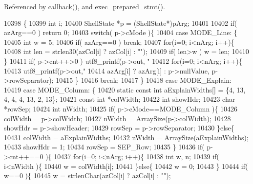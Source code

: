 Referenced by callback(), and exec\+\_\+prepared\+\_\+stmt().


\begin{DoxyCode}
10398  \{
10399   \textcolor{keywordtype}{int} i;
10400   ShellState *p = (ShellState*)pArg;
10401 
10402   \textcolor{keywordflow}{if}( azArg==0 ) \textcolor{keywordflow}{return} 0;
10403   \textcolor{keywordflow}{switch}( p->cMode )\{
10404     \textcolor{keywordflow}{case} MODE_Line: \{
10405       \textcolor{keywordtype}{int} w = 5;
10406       \textcolor{keywordflow}{if}( azArg==0 ) \textcolor{keywordflow}{break};
10407       \textcolor{keywordflow}{for}(i=0; i<nArg; i++)\{
10408         \textcolor{keywordtype}{int} len = strlen30(azCol[i] ? azCol[i] : \textcolor{stringliteral}{""});
10409         \textcolor{keywordflow}{if}( len>w ) w = len;
10410       \}
10411       \textcolor{keywordflow}{if}( p->cnt++>0 ) utf8_printf(p->out, \textcolor{stringliteral}{"%
10412       \textcolor{keywordflow}{for}(i=0; i<nArg; i++)\{
10413         utf8_printf(p->out,\textcolor{stringliteral}{"%
10414                 azArg[i] ? azArg[i] : p->nullValue, p->rowSeparator);
10415       \}
10416       \textcolor{keywordflow}{break};
10417     \}
10418     \textcolor{keywordflow}{case} MODE_Explain:
10419     \textcolor{keywordflow}{case} MODE_Column: \{
10420       \textcolor{keyword}{static} \textcolor{keyword}{const} \textcolor{keywordtype}{int} aExplainWidths[] = \{4, 13, 4, 4, 4, 13, 2, 13\};
10421       \textcolor{keyword}{const} \textcolor{keywordtype}{int} *colWidth;
10422       \textcolor{keywordtype}{int} showHdr;
10423       \textcolor{keywordtype}{char} *rowSep;
10424       \textcolor{keywordtype}{int} nWidth;
10425       \textcolor{keywordflow}{if}( p->cMode==MODE_Column )\{
10426         colWidth = p->colWidth;
10427         nWidth = ArraySize(p->colWidth);
10428         showHdr = p->showHeader;
10429         rowSep = p->rowSeparator;
10430       \}\textcolor{keywordflow}{else}\{
10431         colWidth = aExplainWidths;
10432         nWidth = ArraySize(aExplainWidths);
10433         showHdr = 1;
10434         rowSep = SEP_Row;
10435       \}
10436       \textcolor{keywordflow}{if}( p->cnt++==0 )\{
10437         \textcolor{keywordflow}{for}(i=0; i<nArg; i++)\{
10438           \textcolor{keywordtype}{int} w, n;
10439           \textcolor{keywordflow}{if}( i<nWidth )\{
10440             w = colWidth[i];
10441           \}\textcolor{keywordflow}{else}\{
10442             w = 0;
10443           \}
10444           \textcolor{keywordflow}{if}( w==0 )\{
10445             w = strlenChar(azCol[i] ? azCol[i] : \textcolor{stringliteral}{""});
}}
\end{DoxyCode}
